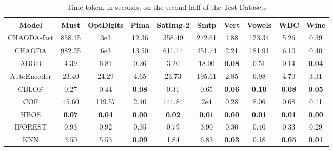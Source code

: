 \begin{table}[!t]
\renewcommand{\arraystretch}{1.15}
\caption{Time taken, in seconds, on the second half of the Test Datasets}
\label{supplement:table:results:test-time-2}
\vskip 0.15in
\begin{center}
\begin{small}
\begin{tabular}{|c|c|c|c|c|c|c|c|c|c|}
\hline
\textbf{Model} & \textbf{Must} & \textbf{OptDigits} & \textbf{Pima} & \textbf{SatImg-2} & \textbf{Smtp} & \textbf{Vert} & \textbf{Vowels} &  \textbf{WBC} & \textbf{Wine} \\
\hline
CHAODA-fast &        858.15 &            3e3 &         12.36 &              358.49 &        272.61 &               1.88 &          123.34 &          5.26 &          0.39 \\
\hline
CHAODA &        982.25 &            6e3 &         13.50 &              611.14 &        451.74 &               2.21 &          181.91 &          6.10 &          0.40 \\
\hline
ABOD &          4.39 &               6.81 &          0.26 &                3.20 &         18.00 &      \textbf{0.08} &            0.51 &          0.14 & \textbf{0.04} \\
\hline
AutoEncoder &         23.40 &              24.29 &          4.65 &               23.73 &        195.61 &               2.85 &            6.98 &          4.70 &          3.31 \\
\hline
CBLOF &          0.27 &               0.44 & \textbf{0.08} &                0.31 &          0.65 &      \textbf{0.06} &   \textbf{0.10} & \textbf{0.08} & \textbf{0.05} \\
\hline
COF &         45.60 &             119.57 &          2.40 &              141.84 &      2e4 &               0.28 &            8.06 &          0.68 &          0.11 \\
\hline
HBOS & \textbf{0.07} &      \textbf{0.04} & \textbf{0.00} &       \textbf{0.02} & \textbf{0.01} &      \textbf{0.00} &   \textbf{0.01} & \textbf{0.01} & \textbf{0.00} \\
\hline
IFOREST &          0.93 &               0.92 &          0.35 &                0.79 &          3.90 &               0.30 &            0.40 &          0.33 &          0.29 \\
\hline
KNN &          3.50 &               5.53 & \textbf{0.09} &                1.84 &          6.83 &      \textbf{0.03} &            0.18 & \textbf{0.05} & \textbf{0.01} \\

\end{tabular}
\end{small}
\end{center}
\end{table}
